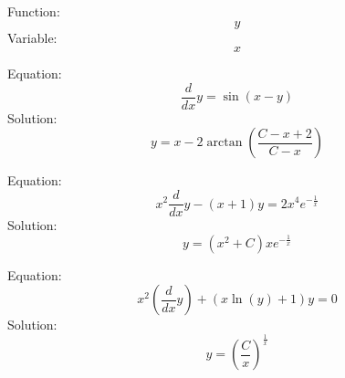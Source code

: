 \documentclass{article}
\begin{document}
Function:
$$
y
$$
Variable:
$$
x
$$


Equation:
$$
\frac{d}{dx}y=\sin(x-y)
$$
Solution:
$$
y=x-2 \arctan(\frac{C-x+2}{C-x})
$$

Equation:
$$
x^2 \frac{d}{dx}y-(x+1)y=2x^4 e^{-\frac{1}{x}}
$$
Solution:
$$
y=(x^2+C)xe^{-\frac{1}{x}}
$$

Equation:
$$
x^2 (\frac{d}{dx}y)+(x\ln(y)+1)y=0
$$
Solution:
$$
y=(\frac{C}{x})^{\frac{1}{x}}
$$
\end{document}
